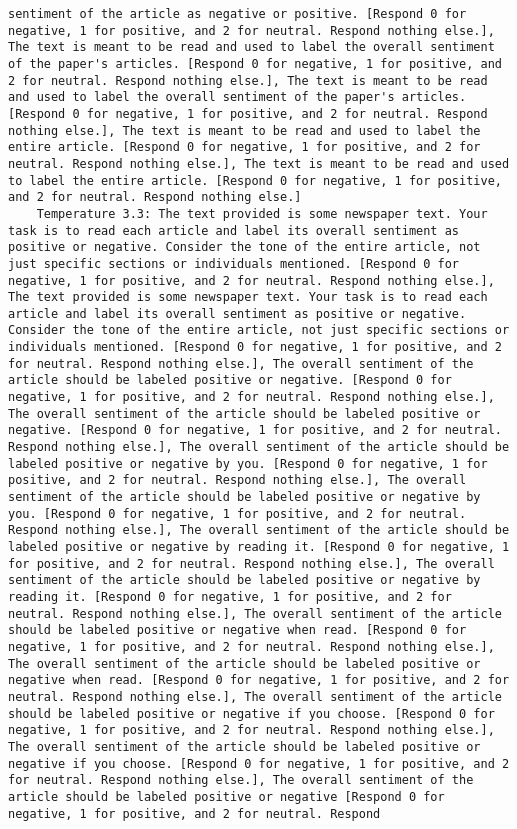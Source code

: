 \begin{lstlisting}[label=lst:poor_performing_prompts]
sentiment of the article as negative or positive. [Respond 0 for negative, 1 for positive, and 2 for neutral. Respond nothing else.], The text is meant to be read and used to label the overall sentiment of the paper's articles. [Respond 0 for negative, 1 for positive, and 2 for neutral. Respond nothing else.], The text is meant to be read and used to label the overall sentiment of the paper's articles. [Respond 0 for negative, 1 for positive, and 2 for neutral. Respond nothing else.], The text is meant to be read and used to label the entire article. [Respond 0 for negative, 1 for positive, and 2 for neutral. Respond nothing else.], The text is meant to be read and used to label the entire article. [Respond 0 for negative, 1 for positive, and 2 for neutral. Respond nothing else.]
	Temperature 3.3: The text provided is some newspaper text. Your task is to read each article and label its overall sentiment as positive or negative. Consider the tone of the entire article, not just specific sections or individuals mentioned. [Respond 0 for negative, 1 for positive, and 2 for neutral. Respond nothing else.], The text provided is some newspaper text. Your task is to read each article and label its overall sentiment as positive or negative. Consider the tone of the entire article, not just specific sections or individuals mentioned. [Respond 0 for negative, 1 for positive, and 2 for neutral. Respond nothing else.], The overall sentiment of the article should be labeled positive or negative. [Respond 0 for negative, 1 for positive, and 2 for neutral. Respond nothing else.], The overall sentiment of the article should be labeled positive or negative. [Respond 0 for negative, 1 for positive, and 2 for neutral. Respond nothing else.], The overall sentiment of the article should be labeled positive or negative by you. [Respond 0 for negative, 1 for positive, and 2 for neutral. Respond nothing else.], The overall sentiment of the article should be labeled positive or negative by you. [Respond 0 for negative, 1 for positive, and 2 for neutral. Respond nothing else.], The overall sentiment of the article should be labeled positive or negative by reading it. [Respond 0 for negative, 1 for positive, and 2 for neutral. Respond nothing else.], The overall sentiment of the article should be labeled positive or negative by reading it. [Respond 0 for negative, 1 for positive, and 2 for neutral. Respond nothing else.], The overall sentiment of the article should be labeled positive or negative when read. [Respond 0 for negative, 1 for positive, and 2 for neutral. Respond nothing else.], The overall sentiment of the article should be labeled positive or negative when read. [Respond 0 for negative, 1 for positive, and 2 for neutral. Respond nothing else.], The overall sentiment of the article should be labeled positive or negative if you choose. [Respond 0 for negative, 1 for positive, and 2 for neutral. Respond nothing else.], The overall sentiment of the article should be labeled positive or negative if you choose. [Respond 0 for negative, 1 for positive, and 2 for neutral. Respond nothing else.], The overall sentiment of the article should be labeled positive or negative [Respond 0 for negative, 1 for positive, and 2 for neutral. Respond 
\end{lstlisting}
